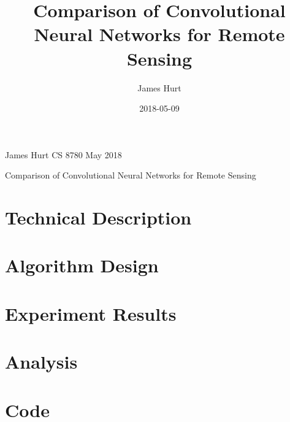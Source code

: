 \documentclass[11pt]{article}
\title{Comparison of Convolutional Neural Networks for Remote Sensing}
\date{2018-05-09}
\author{James Hurt}
\begin{document}
	
	\begin{flushright}
		James Hurt\break
		CS 8780 May 2018
	\end{flushright}
	\begin{center}
		\huge{Comparison of Convolutional Neural Networks for Remote Sensing}\break
	\end{center}
	
	
	\section{Technical Description}
	
	\section{Algorithm Design}
	
	\section{Experiment Results}
	
	\section{Analysis}
	
	\section{Code}
	
	
\end{document}
